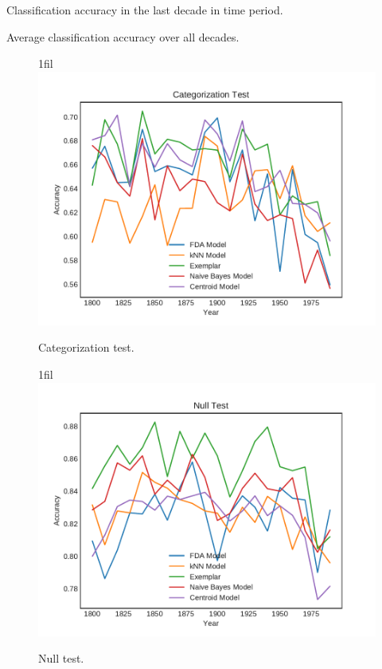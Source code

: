 \documentclass{article}
\makeatletter
\newcommand*{\centerfloat}{%
  \parindent \z@
  \leftskip \z@ \@plus 1fil \@minus \textwidth
  \rightskip\leftskip
  \parfillskip \z@skip}
\makeatother
\begin{document}
\begin{table}
    \centering
    \caption{Classification accuracy in the last decade in time period.}
\end{table}

\begin{table}
    \centering
    \caption{Average classification accuracy over all decades.}
\end{table}


\begin{figure}
    \centerfloat
    \includegraphics[width=1.75\linewidth]{results_categorization_test.pdf}
    \caption{Categorization test.}
\end{figure}

\begin{figure}
    \centerfloat
    \includegraphics[width=1.75\linewidth]{results_null_test.pdf}
    \caption{Null test.}
\end{figure}
\end{document}
